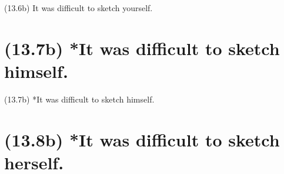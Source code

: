 \documentclass{article}
\begin{document}
\bigbreak
\begin{enumerate*}
\item[(13.6b)] It was difficult to sketch yourself.
\end{enumerate*}
\bigbreak

\bigbreak
\begin{minipage}{\textwidth}
\end{minipage}
\bigbreak

\clearpage

%
%

\section*{(13.7b) *It was difficult to sketch himself.}

\bigbreak
\begin{enumerate*}
\item[(13.7b)] *It was difficult to sketch himself.
\end{enumerate*}
\bigbreak

\bigbreak
\begin{minipage}{\textwidth}
\end{minipage}
\bigbreak

\clearpage

%
%

\section*{(13.8b) *It was difficult to sketch herself.}
\end{document}
